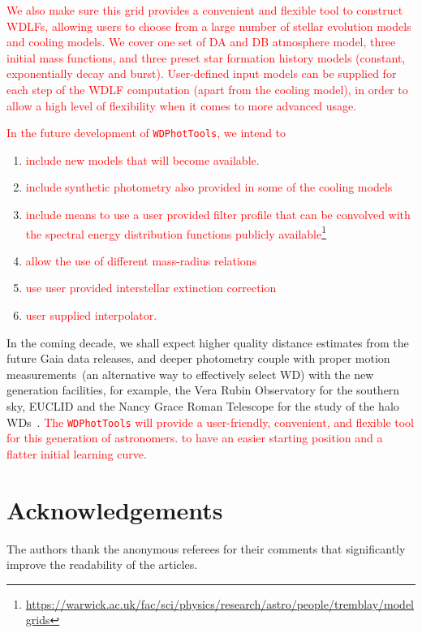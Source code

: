 \documentclass[fleqn,usenatbib]{rasti}
\begin{document}
\textcolor{red}{We also make sure this grid provides a convenient and flexible
tool to construct WDLFs, allowing users to choose from a large number of
stellar evolution models and cooling models. We cover one set of DA and DB
atmosphere model, three initial mass functions, and three preset star formation
history models (constant, exponentially decay and burst). User-defined input
models can be supplied for each step of the WDLF computation (apart from
the cooling model), in order to allow a high level of flexibility when it
comes to more advanced usage.

In the future development of \texttt{WDPhotTools}, we intend to}
\begin{enumerate}
    \item \textcolor{red}{include new models that will become available.}
    \item \textcolor{red}{include synthetic photometry also provided in some of the cooling models}
    \item \textcolor{red}{include means to use a user provided filter profile that can be convolved with the spectral energy distribution functions publicly available\footnote{\url{https://warwick.ac.uk/fac/sci/physics/research/astro/people/tremblay/modelgrids}}}
    \item \textcolor{red}{allow the use of different mass-radius relations}
    \item \textcolor{red}{use user provided interstellar extinction correction}
    \item \textcolor{red}{user supplied interpolator.}
\end{enumerate}


In the coming decade, we shall expect higher quality distance estimates from
the future Gaia data releases, and deeper photometry couple with proper
motion measurements~(an alternative way to effectively select WD) with the
new generation facilities, for example, the Vera Rubin Observatory for the
southern sky, EUCLID and the Nancy Grace Roman Telescope for the study of the
halo WDs~\citep{2020ApJ...900..139F}. \textcolor{red}{The \texttt{WDPhotTools} will provide a user-friendly, convenient, and flexible tool for this generation of astronomers.
to have an easier starting position and a flatter initial learning curve.}

\section*{Acknowledgements}
The authors thank the anonymous referees for their comments that significantly
improve the readability of the articles.
\end{document}
